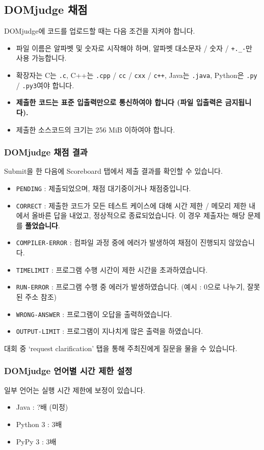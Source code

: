 \subsection*{DOMjudge 채점}
DOMjudge에 코드를 업로드할 때는 다음 조건을 지켜야 합니다.
\begin{itemize}
    \item 파일 이름은 알파벳 및 숫자로 시작해야 하며, 알파벳 대소문자 / 숫자 / \verb|+._-|만 사용 가능합니다.
    \item 확장자는 C는 \verb|.c|, C++는 \verb|.cpp| / \verb|cc| /  \verb|cxx| / \verb|c++|, Java는 \verb|.java|, Python은 \verb|.py| / \verb|.py3|여야 합니다.
    \item \textbf{제출한 코드는 표준 입출력만으로 통신하여야 합니다 (파일 입출력은 금지됩니다).}
    \item 제출한 소스코드의 크기는 256 MiB 이하여야 합니다.
\end{itemize}

\subsubsection*{DOMjudge 채점 결과}
Submit을 한 다음에 Scoreboard 탭에서 제출 결과를 확인할 수 있습니다.
\begin{itemize}
    \item {\color{gray}\texttt{PENDING}} : 제출되었으며, 채점 대기중이거나 채점중입니다.
    \item {\color{my-green}\texttt{CORRECT}} : 제출한 코드가 모든 테스트 케이스에 대해 시간 제한 / 메모리 제한 내에서 올바른 답을 내었고, 정상적으로 종료되었습니다. 이 경우 제출자는 해당 문제를 \textbf{풀었습니다}.
    \item {\color{red}\texttt{COMPILER-ERROR}} : 컴파일 과정 중에 에러가 발생하여 채점이 진행되지 않았습니다.
    \item {\color{red}\texttt{TIMELIMIT}} : 프로그램 수행 시간이 제한 시간을 초과하였습니다.
    \item {\color{red}\texttt{RUN-ERROR}} : 프로그램 수행 중 에러가 발생하였습니다. (예시 : 0으로 나누기, 잘못된 주소 참조)
    \item {\color{red}\texttt{WRONG-ANSWER}} : 프로그램이 오답을 출력하였습니다.
    \item {\color{red}\texttt{OUTPUT-LIMIT}} : 프로그램이 지나치게 많은 출력을 하였습니다.
\end{itemize}
대회 중 `request clarification' 탭을 통해 주최진에게 질문을 물을 수 있습니다.

\subsubsection*{DOMjudge 언어별 시간 제한 설정}
일부 언어는 실행 시간 제한에 보정이 있습니다.
\begin{itemize}
    \item Java : ?배 {\color{red}(미정)}
    \item Python 3 : 3배
    \item PyPy 3 : 3배
\end{itemize}
